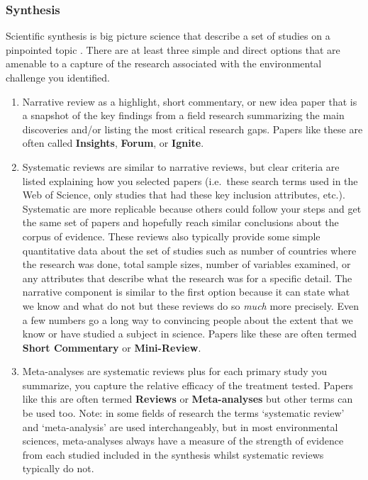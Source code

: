 \documentclass[
]{book}
\begin{document}
\hypertarget{synthesis-1}{%
\subsubsection*{Synthesis}\label{synthesis-1}}

Scientific synthesis is big picture science that describe a set of studies on a pinpointed topic \citep{RN3216}. There are at least three simple and direct options that are amenable to a capture of the research associated with the environmental challenge you identified.

\begin{enumerate}
\def\labelenumi{(\arabic{enumi})}
\item
  Narrative review as a highlight, short commentary, or new idea paper that is a snapshot of the key findings from a field research summarizing the main discoveries and/or listing the most critical research gaps. Papers like these are often called \textbf{Insights}, \textbf{Forum}, or \textbf{Ignite}.
\item
  Systematic reviews are similar to narrative reviews, but clear criteria are listed explaining how you selected papers (i.e.~these search terms used in the Web of Science, only studies that had these key inclusion attributes, etc.). Systematic are more replicable because others could follow your steps and get the same set of papers and hopefully reach similar conclusions about the corpus of evidence. These reviews also typically provide some simple quantitative data about the set of studies such as number of countries where the research was done, total sample sizes, number of variables examined, or any attributes that describe what the research was for a specific detail. The narrative component is similar to the first option because it can state what we know and what do not but these reviews do so \emph{much} more precisely. Even a few numbers go a long way to convincing people about the extent that we know or have studied a subject in science. Papers like these are often termed \textbf{Short Commentary} or \textbf{Mini-Review}.
\item
  Meta-analyses are systematic reviews plus for each primary study you summarize, you capture the relative efficacy of the treatment tested. Papers like this are often termed \textbf{Reviews} or \textbf{Meta-analyses} but other terms can be used too. Note: in some fields of research the terms `systematic review' and `meta-analysis' are used interchangeably, but in most environmental sciences, meta-analyses always have a measure of the strength of evidence from each studied included in the synthesis whilst systematic reviews typically do not.
\end{enumerate}
\end{document}
